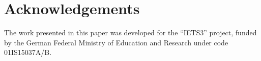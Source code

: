 \documentclass{llncs}
\begin{document}
 



 



%



 

\section*{Acknowledgements}
The work presented in this paper was developed for the ``IETS3'' project, funded
by the German Federal Ministry of Education and Research under code
01IS15037A/B.
 \vspace{-0cm}



\end{document}
